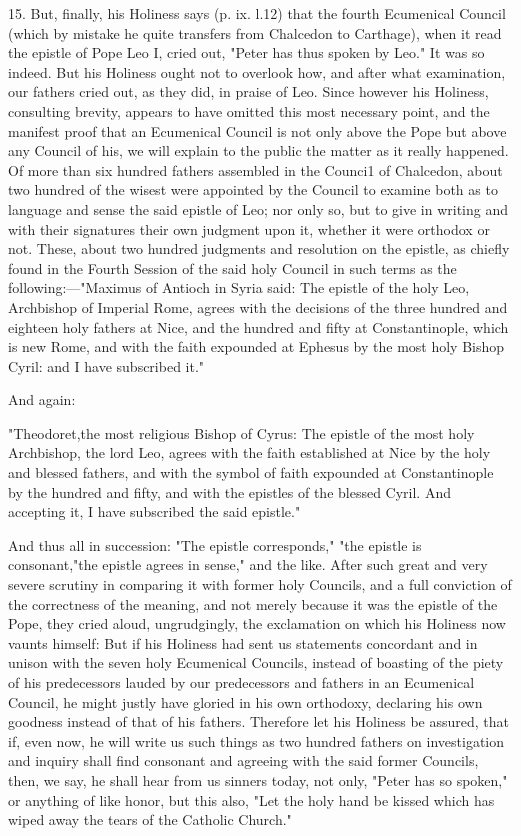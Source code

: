 15. But, finally, his Holiness says (p. ix. l.12) that the fourth
Ecumenical Council (which by mistake he quite transfers from Chalcedon
to Carthage), when it read the epistle of Pope Leo I, cried out, "Peter
has thus spoken by Leo." It was so indeed. But his Holiness ought not to
overlook how, and after what examination, our fathers cried out, as they
did, in praise of Leo. Since however his Holiness, consulting brevity,
appears to have omitted this most necessary point, and the manifest
proof that an Ecumenical Council is not only above the Pope but above
any Council of his, we will explain to the public the matter as it
really happened. Of more than six hundred fathers assembled in the
Counci1 of Chalcedon, about two hundred of the wisest were appointed by
the Council to examine both as to language and sense the said epistle of
Leo; nor only so, but to give in writing and with their signatures their
own judgment upon it, whether it were orthodox or not. These, about two
hundred judgments and resolution on the epistle, as chiefly found in the
Fourth Session of the said holy Council in such terms as the
following:---"Maximus of Antioch in Syria said: \textquotesingle The
epistle of the holy Leo, Archbishop of Imperial Rome, agrees with the
decisions of the three hundred and eighteen holy fathers at Nice, and
the hundred and fifty at Constantinople, which is new Rome, and with the
faith expounded at Ephesus by the most holy Bishop Cyril: and I have
subscribed it."

And again:

"Theodoret,the most religious Bishop of Cyrus: \textquotesingle The
epistle of the most holy Archbishop, the lord Leo, agrees with the faith
established at Nice by the holy and blessed fathers, and with the symbol
of faith expounded at Constantinople by the hundred and fifty, and with
the epistles of the blessed Cyril. And accepting it, I have subscribed
the said epistle."\textquotesingle{}

And thus all in succession: "The epistle corresponds," "the epistle is
consonant,"the epistle agrees in sense," and the like. After such great
and very severe scrutiny in comparing it with former holy Councils, and
a full conviction of the correctness of the meaning, and not merely
because it was the epistle of the Pope, they cried aloud, ungrudgingly,
the exclamation on which his Holiness now vaunts himself: But if his
Holiness had sent us statements concordant and in unison with the seven
holy Ecumenical Councils, instead of boasting of the piety of his
predecessors lauded by our predecessors and fathers in an Ecumenical
Council, he might justly have gloried in his own orthodoxy, declaring
his own goodness instead of that of his fathers. Therefore let his
Holiness be assured, that if, even now, he will write us such things as
two hundred fathers on investigation and inquiry shall find consonant
and agreeing with the said former Councils, then, we say, he shall hear
from us sinners today, not only, "Peter has so spoken," or anything of
like honor, but this also, "Let the holy hand be kissed which has wiped
away the tears of the Catholic Church."

